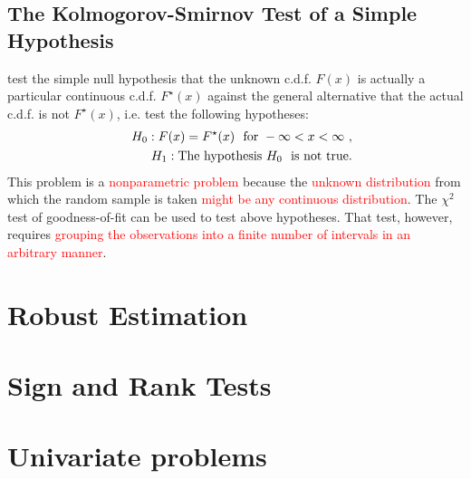 \documentclass[12pt,a4paper]{article}
\begin{document}
\subsection{The Kolmogorov-Smirnov Test of a Simple Hypothesis}
test the simple null hypothesis that the unknown c.d.f. $F(x)$ is actually a particular continuous c.d.f. $F^\star(x)$ against the general alternative that the actual c.d.f. is not $F^\star(x)$, i.e. test the following hypotheses:
\begin{eqnarray}
&&H_0 : F(x) = F^\star(x) ~~ {\rm for} ~ -\infty < x < \infty ~, \\
&&H_1 : {\rm The ~hypothesis} ~H_0~ {\rm ~is ~not ~true.}
\end{eqnarray}
This problem is a \textcolor{red}{nonparametric problem} because the  \textcolor{red}{unknown distribution} from which the random sample is taken \textcolor{red}{might be any continuous distribution}. The $\chi^2$ test of goodness-of-fit can be used to test above hypotheses. That test, however, requires \textcolor{red}{grouping the observations into a finite number of intervals in an arbitrary manner}. 








\section{Robust Estimation}




\section{Sign and Rank Tests}



\section{Univariate problems}
\end{document}
